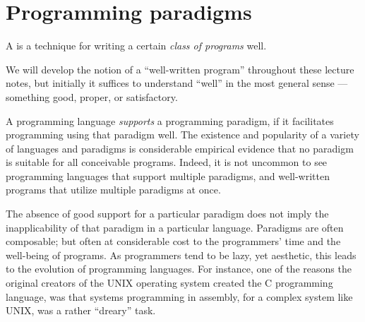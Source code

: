 \section{Programming paradigms}

\begin{definition}

A  is a technique for writing a certain \emph{class
of programs} well.

\end{definition}

We will develop the notion of a ``well-written program''
throughout these lecture notes, but initially it suffices to understand
``well'' in the most general sense --- something good, proper, or satisfactory.

A programming language \emph{supports} a programming paradigm, if it
facilitates programming using that paradigm well. The existence and popularity
of a variety of languages and paradigms is considerable empirical evidence that
no paradigm is suitable for all conceivable programs. Indeed, it is not
uncommon to see programming languages that support multiple paradigms, and
well-written programs that utilize multiple paradigms at once.

The absence of good support for a particular paradigm does not imply the
inapplicability of that paradigm in a particular language.  Paradigms are often
composable; but often at considerable cost to the programmers' time and the
well-being of programs. As programmers tend to be lazy, yet aesthetic, this
leads to the evolution of programming languages. For instance, one of the
reasons the original creators of the UNIX operating system created the C
programming language, was that systems programming in assembly, for a complex
system like UNIX, was a rather ``dreary'' task\cite{the-development-of-c}.







